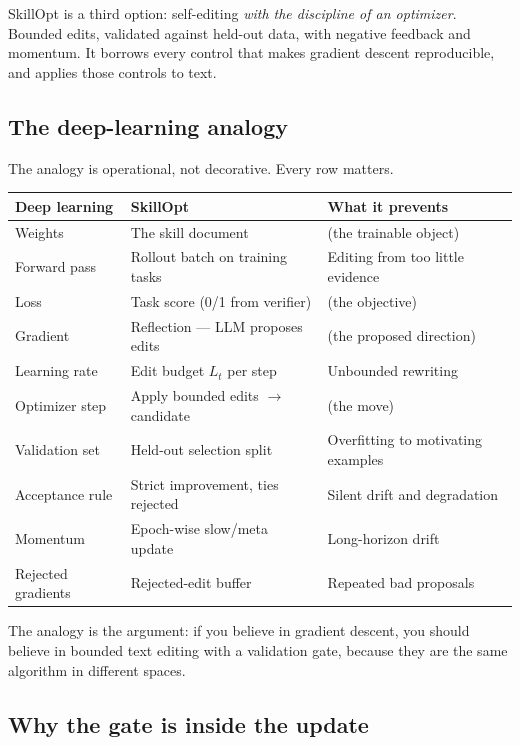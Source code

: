 \documentclass[11pt,a4paper]{article}
\begin{document}
SkillOpt is a third option: self-editing \emph{with the discipline of
an optimizer}. Bounded edits, validated against held-out data, with
negative feedback and momentum. It borrows every control that makes
gradient descent reproducible, and applies those controls to text.

\subsection{The deep-learning analogy}

The analogy is operational, not decorative. Every row matters.

\begin{table}[h]
\centering
\small
\begin{tabular}{@{}lll@{}}
\toprule
Deep learning & SkillOpt & What it prevents \\
\midrule
Weights & The skill document & (the trainable object) \\
Forward pass & Rollout batch on training tasks & Editing from too little evidence \\
Loss & Task score (0/1 from verifier) & (the objective) \\
Gradient & Reflection --- LLM proposes edits & (the proposed direction) \\
Learning rate & Edit budget \(L_t\) per step & Unbounded rewriting \\
Optimizer step & Apply bounded edits \(\to\) candidate & (the move) \\
Validation set & Held-out selection split & Overfitting to motivating examples \\
Acceptance rule & Strict improvement, ties rejected & Silent drift and degradation \\
Momentum & Epoch-wise slow/meta update & Long-horizon drift \\
Rejected gradients & Rejected-edit buffer & Repeated bad proposals \\
\bottomrule
\end{tabular}
\end{table}

The analogy is the argument: if you believe in gradient descent, you
should believe in bounded text editing with a validation gate, because
they are the same algorithm in different spaces.

\subsection{Why the gate is inside the update}
\end{document}
